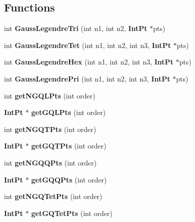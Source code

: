 \subsection*{Functions}
\begin{DoxyCompactItemize}
\item 
int {\bfseries Gauss\-Legendre\-Tri} (int n1, int n2, {\bf Int\-Pt} $\ast$pts)\label{Gauss_8h_af732a5b5fbf6c48182632757d5f19477}

\item 
int {\bfseries Gauss\-Legendre\-Tet} (int n1, int n2, int n3, {\bf Int\-Pt} $\ast$pts)\label{Gauss_8h_a0a45c641c0216cdc57a80da9fd7b2c24}

\item 
int {\bfseries Gauss\-Legendre\-Hex} (int n1, int n2, int n3, {\bf Int\-Pt} $\ast$pts)\label{Gauss_8h_acc8be110b9d21c1a1a1710a7858fda85}

\item 
int {\bfseries Gauss\-Legendre\-Pri} (int n1, int n2, int n3, {\bf Int\-Pt} $\ast$pts)\label{Gauss_8h_ab79425e57ebe9c2a773003d961bf1abb}

\item 
int {\bfseries get\-N\-G\-Q\-L\-Pts} (int order)\label{Gauss_8h_a79913d30c41fd4e8ca9828519704572e}

\item 
{\bf Int\-Pt} $\ast$ {\bfseries get\-G\-Q\-L\-Pts} (int order)\label{Gauss_8h_ac10710cd6e0e978c39a5e96a72d2036f}

\item 
int {\bfseries get\-N\-G\-Q\-T\-Pts} (int order)\label{Gauss_8h_ab695c73eeb045af972383bd170d97e62}

\item 
{\bf Int\-Pt} $\ast$ {\bfseries get\-G\-Q\-T\-Pts} (int order)\label{Gauss_8h_a9e205e2398f2aab9fbfb48d12ae81cc9}

\item 
int {\bfseries get\-N\-G\-Q\-Q\-Pts} (int order)\label{Gauss_8h_a176646b904ec6b07b5d1264da5b0bff0}

\item 
{\bf Int\-Pt} $\ast$ {\bfseries get\-G\-Q\-Q\-Pts} (int order)\label{Gauss_8h_a90cbfe7bc9ccc0b326d6d7678bb6cbbd}

\item 
int {\bfseries get\-N\-G\-Q\-Tet\-Pts} (int order)\label{Gauss_8h_a1282cd52b52f5b92299c1f8afd99f7e9}

\item 
{\bf Int\-Pt} $\ast$ {\bfseries get\-G\-Q\-Tet\-Pts} (int order)\label{Gauss_8h_a26bce4ed92b15ccc900717af10f9a2b8}


\end{DoxyCompactItemize}

